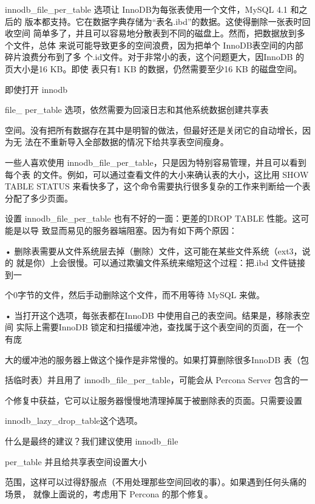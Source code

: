 innodb\_file\_per\_table 选项让 InnoDB为每张表使用一个文件，MySQL 4.1 和之后的
版本都支持。它在数据字典存储为“表名.ibd”的数据。这使得删除一张表时回收空间
简单多了，并且可以容易地分散表到不同的磁盘上。然而，把数据放到多个文件，总体
来说可能导致更多的空间浪费，因为把单个 InnoDB表空间的内部碎片浪费分布到了多
个.id文件。对于非常小的表，这个问题更大，因InnoDB 的页大小是16 KB。即使
表只有1 KB 的数据，仍然需要至少16 KB 的磁盘空间。

即使打开 innodb

file\_ per\_table 选项，依然需要为回滚日志和其他系统数据创建共享表

空间。没有把所有数据存在其中是明智的做法，但最好还是关闭它的自动增长，因为无
法在不重新导入全部数据的情况下给共享表空间瘦身。

一些人喜欢使用 innodb\_file\_per\_table，只是因为特别容易管理，并且可以看到每个表
的文件。例如，可以通过查看文件的大小来确认表的大小，这比用 SHOW TABLE STATUS
来看快多了，这个命令需要执行很多复杂的工作来判断给一个表分配了多少页面。

设置 innodb\_file\_per\_table 也有不好的一面：更差的DROP TABLE 性能。这可能是以导
致显而易见的服务器端阻塞。因为有如下两个原因：

• 删除表需要从文件系统层去掉（删除）文件，这可能在某些文件系统（ext3，说的
就是你）上会很慢。可以通过欺骗文件系统来缩短这个过程：把.ibd 文件链接到一

个0字节的文件，然后手动删除这个文件，而不用等待 MySQL 来做。

• 当打开这个选项，每张表都在InnoDB 中使用自己的表空间。结果是，移除表空间
实际上需要InnoDB 锁定和扫描缓冲池，查找属于这个表空间的页面，在一个有庞

大的缓冲池的服务器上做这个操作是非常慢的。如果打算删除很多InnoDB 表（包

括临时表）并且用了 innodb\_file\_per\_table，可能会从 Percona Server 包含的一

个修复中获益，它可以让服务器慢慢地清理掉属于被删除表的页面。只需要设置

innodb\_lazy\_drop\_table这个选项。

什么是最终的建议？我们建议使用 innodb\_file

per\_table 并且给共享表空间设置大小

范围，这样可以过得舒服点（不用处理那些空间回收的事）。如果遇到任何头痛的场景，
就像上面说的，考虑用下 Percona 的那个修复。

